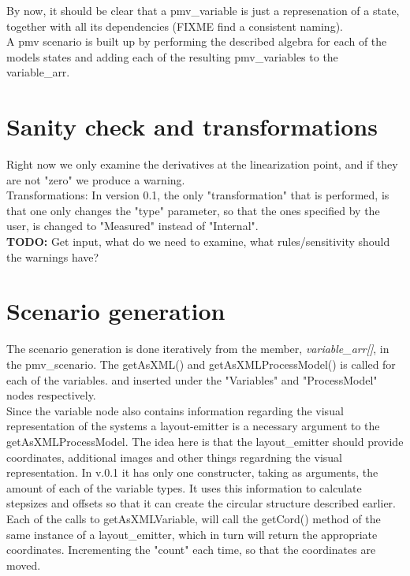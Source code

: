 \documentclass{report}
\begin{document}
By now, it should be clear that a pmv\_variable is just a represenation of a state, together with all its dependencies (FIXME find a consistent naming).\\\newline A pmv scenario is built up by performing the described algebra for each of the models states and adding each of the resulting pmv\_variables to the variable\_arr.

\section{Sanity check and transformations}
Right now we only examine the derivatives at the linearization point, and if they are not "zero" we produce a warning.\\\newline Transformations:
In version 0.1, the only "transformation" that is performed, is that one only changes the "type" parameter, so that the ones specified by the user, is changed to "Measured" instead of "Internal".\\\newline
\textbf{TODO:} Get input, what do we need to examine, what rules/sensitivity should the warnings have?

\section{Scenario generation}
The scenario generation is done iteratively from the member, \textit{variable\_arr[]}, in the pmv\_scenario. The getAsXML() and getAsXMLProcessModel() is called for each of the variables. and inserted under the "Variables" and "ProcessModel" nodes respectively.\\\newline
Since the variable node also contains information regarding the visual representation of the systems a layout-emitter is a necessary argument to the getAsXMLProcessModel. The idea here is that the layout\_emitter should provide coordinates, additional images and other things regardning the visual representation. In v.0.1 it has only one constructer, taking as arguments, the amount of each of the variable types. It uses this information to calculate stepsizes and offsets so that it can create the circular structure described earlier.\\\newline Each of the calls to getAsXMLVariable, will call the getCord() method of the same instance of a layout\_emitter, which in turn will return the appropriate coordinates. Incrementing the "count" each time, so that the coordinates are moved.
\\\newline
\end{document}
